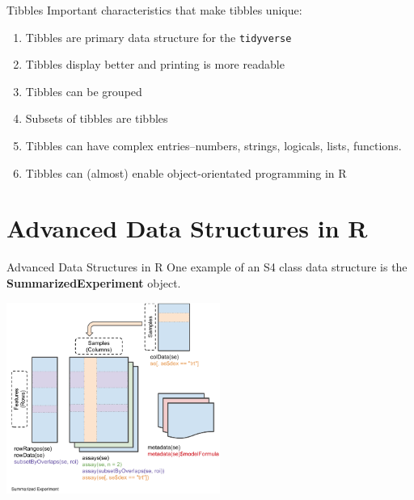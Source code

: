 \documentclass[
  ignorenonframetext,
]{beamer}
\providecommand{\tightlist}{%
  \setlength{\itemsep}{0pt}\setlength{\parskip}{0pt}}
\begin{document}
\begin{frame}[fragile]{Tibbles}
\protect\hypertarget{tibbles-4}{}
Important characteristics that make tibbles unique:

\begin{enumerate}
\tightlist
\item
  Tibbles are primary data structure for the \texttt{tidyverse}
\item
  Tibbles display better and printing is more readable
\item
  Tibbles can be grouped
\item
  Subsets of tibbles are tibbles
\item
  Tibbles can have complex entries--numbers, strings, logicals, lists,
  functions.
\item
  Tibbles can (almost) enable object-orientated programming in R
\end{enumerate}
\end{frame}

\hypertarget{advanced-data-structures-in-r}{%
\section{Advanced Data Structures in
R}\label{advanced-data-structures-in-r}}


\begin{frame}{Advanced Data Structures in R}
\protect\hypertarget{advanced-data-structures-in-r-2}{}
One example of an S4 class data structure is the
\textbf{SummarizedExperiment} object.

\begin{center}
    \includegraphics[width=2.75in]{figs/SummarizedExperiment.png}   
\end{center}
\end{frame}
\end{document}
